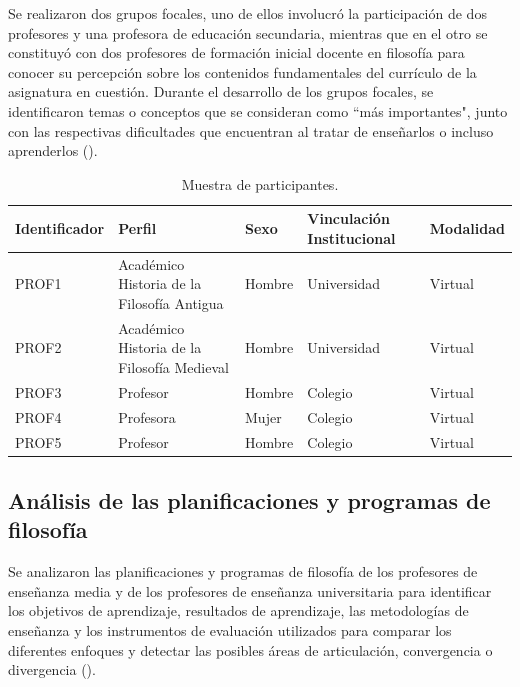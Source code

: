 \documentclass[spanish]{textolivre}
\begin{document}
Se realizaron dos grupos focales, uno de ellos involucró la participación de dos profesores y una profesora de educación secundaria, mientras que en el otro se constituyó con dos profesores de formación inicial docente en filosofía para conocer su percepción sobre los contenidos fundamentales del currículo de la asignatura en cuestión. Durante el desarrollo de los grupos focales, se identificaron temas o conceptos que se consideran como ``más importantes", junto con las respectivas dificultades que encuentran al tratar de enseñarlos o incluso aprenderlos \cite{lombardo-bertolini2024} ().

\begin{table}[h!]
\centering
\caption{Muestra de participantes.}\label{tab-1}
\begin{tabularx}{\textwidth}{lXlXl}
\toprule
Identificador & Perfil & Sexo & Vinculación Institucional & Modalidad \\
\midrule
PROF1 & Académico Historia de la Filosofía Antigua & Hombre & Universidad & Virtual \\
PROF2 & Académico Historia de la Filosofía Medieval & Hombre & Universidad & Virtual \\
PROF3 & Profesor & Hombre & Colegio & Virtual \\
PROF4 & Profesora & Mujer & Colegio & Virtual \\
PROF5 & Profesor & Hombre & Colegio & Virtual \\
\bottomrule
\end{tabularx}
\end{table}

\subsection{Análisis de las planificaciones y programas de filosofía}
Se analizaron las planificaciones y programas de filosofía de los profesores de enseñanza media y de los profesores de enseñanza universitaria para identificar los objetivos de aprendizaje, resultados de aprendizaje, las metodologías de enseñanza y los instrumentos de evaluación utilizados para comparar los diferentes enfoques y detectar las posibles áreas de articulación, convergencia o divergencia ().
\end{document}
